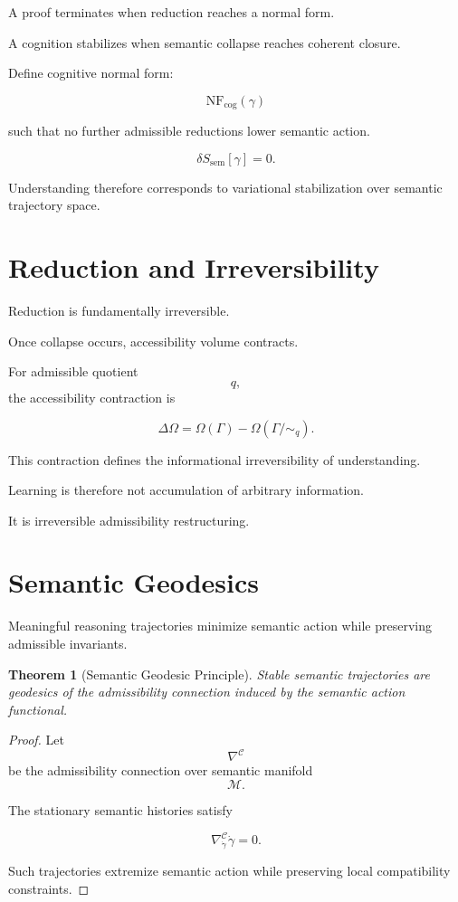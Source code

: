 \documentclass[12pt,openany]{book}
\theoremstyle{plain}
\newtheorem{theorem}{Theorem}[chapter]
\theoremstyle{definition}
\theoremstyle{remark}
\begin{document}
A proof terminates when reduction reaches a normal form.

A cognition stabilizes when semantic collapse reaches coherent
closure.

Define cognitive normal form:

\[
\mathrm{NF}_{\mathrm{cog}}(\gamma)
\]

such that no further admissible reductions lower semantic action.

\[
\delta S_{\mathrm{sem}}[\gamma]
=
0.
\]

Understanding therefore corresponds to variational stabilization
over semantic trajectory space.

\section{Reduction and Irreversibility}

Reduction is fundamentally irreversible.

Once collapse occurs, accessibility volume contracts.

For admissible quotient
\[
q,
\]
the accessibility contraction is

\[
\Delta\Omega
=
\Omega(\Gamma)
-
\Omega(\Gamma/{\sim_q}).
\]

This contraction defines the informational irreversibility of
understanding.

Learning is therefore not accumulation of arbitrary information.

It is irreversible admissibility restructuring.

\section{Semantic Geodesics}

Meaningful reasoning trajectories minimize semantic action while
preserving admissible invariants.

\begin{theorem}[Semantic Geodesic Principle]
Stable semantic trajectories are geodesics of the admissibility
connection induced by the semantic action functional.
\end{theorem}

\begin{proof}
Let
\[
\nabla^\mathcal{C}
\]
be the admissibility connection over semantic manifold
\[
\mathcal{M}.
\]

The stationary semantic histories satisfy

\[
\nabla^\mathcal{C}_{\dot\gamma}\dot\gamma
=
0.
\]

Such trajectories extremize semantic action while preserving
local compatibility constraints.
\end{proof}
\end{document}
